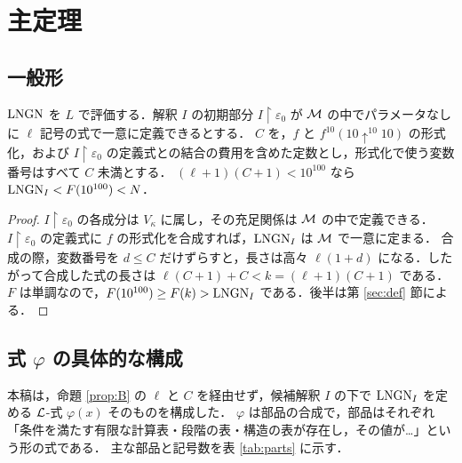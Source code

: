 \section{主定理}\label{sec:main}

\subsection{一般形}
\begin{proposition}[条件つき支配]\label{prop:B}
$\mathrm{LNGN}$ を $L$ で評価する．解釈 $I$ の初期部分 $I\restriction\varepsilon_0$ が $\mathcal{M}$ の中でパラメータなしに $\ell$ 記号の式で一意に定義できるとする．
$C$ を，$f$ と $f^{10}(10\uparrow^{10}10)$ の形式化，および $I\restriction\varepsilon_0$ の定義式との結合の費用を含めた定数とし，形式化で使う変数番号はすべて $C$ 未満とする．
$(\ell+1)(C+1)<10^{100}$ なら $\mathrm{LNGN}_I<F(10^{100})<N$．
\end{proposition}
\begin{proof}
$I\restriction\varepsilon_0$ の各成分は $V_\kappa$ に属し，その充足関係は $\mathcal{M}$ の中で定義できる．$I\restriction\varepsilon_0$ の定義式に $f$ の形式化を合成すれば，$\mathrm{LNGN}_I$ は $\mathcal{M}$ で一意に定まる．
合成の際，変数番号を $d\le C$ だけずらすと，長さは高々 $\ell(1+d)$ になる．したがって合成した式の長さは $\ell(C+1)+C<k=(\ell+1)(C+1)$ である．
$F$ は単調なので，$F(10^{100})\ge F(k)>\mathrm{LNGN}_I$ である．後半は第 \ref{sec:def} 節による．
\end{proof}

\subsection{式 $\varphi$ の具体的な構成}
本稿は，命題 \ref{prop:B} の $\ell$ と $C$ を経由せず，候補解釈 $I$ の下で $\mathrm{LNGN}_I$ を定める $\mathcal{L}$-式 $\varphi(x)$ そのものを構成した．
$\varphi$ は部品の合成で，部品はそれぞれ「条件を満たす有限な計算表・段階の表・構造の表が存在し，その値が\ldots」という形の式である．
主な部品と記号数を表 \ref{tab:parts} に示す．

